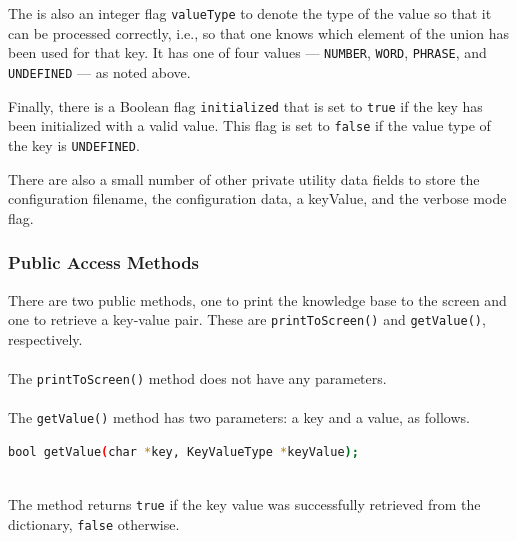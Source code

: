 \documentclass{CSSRforAfrica}
\begin{document}
The is also an integer flag {\small \tt valueType} to denote the type of the value so that it can be processed correctly, i.e., so that one knows which element of the union has been used for that key.  It has one of four values --- {\small \tt NUMBER},  {\small \tt WORD}, {\small \tt PHRASE}, and  {\small \tt UNDEFINED} --- as noted above.

Finally, there is a Boolean flag {\small \tt initialized} that is set to {\small \tt true} if the key has been initialized with a valid value.  This flag is set to {\small \tt false} if the value type of the key is {\small \tt UNDEFINED}.

There are also a small number of other private utility data fields to store the configuration filename, the configuration data, a keyValue, and the verbose mode flag.

\newpage 

\subsubsection{Public Access Methods}
There are two public methods, one to print the knowledge base to the screen  and one to retrieve a key-value pair. These are {\small \tt printToScreen()} and  {\small \tt getValue()}, respectively.
~\\~\\
The {\small \tt printToScreen()} method does not have any parameters.
~\\~\\
The  {\small \tt getValue()}  method has two parameters: a key and a value, as follows.
~\\
\begin{lstlisting}[style=withoutNumbering, language=bash] 
bool getValue(char *key, KeyValueType *keyValue);
\end{lstlisting}
~\\
\noindent The method returns {\small \tt true} if the key value was successfully retrieved from the dictionary, {\small \tt false} otherwise.

\newpage
\end{document}
